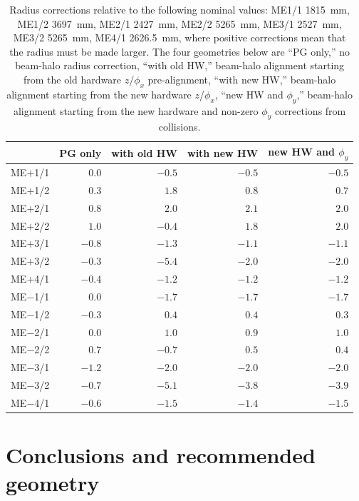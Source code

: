 \documentclass[12pt]{article}
\begin{document}
\begin{table}
\caption{Radius corrections relative to the following nominal values:
  ME1/1 1815~mm, ME1/2 3697~mm, ME2/1 2427~mm, ME2/2 5265~mm, ME3/1
  2527~mm, ME3/2 5265~mm, ME4/1 2626.5~mm, where positive corrections
  mean that the radius must be made larger.  The four geometries below
  are ``PG only,'' no beam-halo radius correction, ``with old HW,''
  beam-halo alignment starting from the old hardware $z$/$\phi_x$
  pre-alignment, ``with new HW,'' beam-halo alignment starting from
  the new hardware $z$/$\phi_x$, ``new HW and $\phi_y$,'' beam-halo
  alignment starting from the new hardware and non-zero $\phi_y$
  corrections from collisions. \label{tab:radiuscorrections}}
\begin{center}
\begin{tabular}{c r r r r}
& PG only & with old HW & with new HW & new HW and $\phi_y$ \\\hline
ME$+$1/1 &  $0.0$ & $-0.5$ & $-0.5$ & $-0.5$ \\
ME$+$1/2 &  $0.3$ &  $1.8$ &  $0.8$ &  $0.7$ \\
ME$+$2/1 &  $0.8$ &  $2.0$ &  $2.1$ &  $2.0$ \\
ME$+$2/2 &  $1.0$ & $-0.4$ &  $1.8$ &  $2.0$ \\
ME$+$3/1 & $-0.8$ & $-1.3$ & $-1.1$ & $-1.1$ \\
ME$+$3/2 & $-0.3$ & $-5.4$ & $-2.0$ & $-2.0$ \\
ME$+$4/1 & $-0.4$ & $-1.2$ & $-1.2$ & $-1.2$ \\\hline
ME$-$1/1 &  $0.0$ & $-1.7$ & $-1.7$ & $-1.7$ \\
ME$-$1/2 & $-0.3$ &  $0.4$ &  $0.4$ &  $0.3$ \\
ME$-$2/1 &  $0.0$ &  $1.0$ &  $0.9$ &  $1.0$ \\
ME$-$2/2 &  $0.7$ & $-0.7$ &  $0.5$ &  $0.4$ \\
ME$-$3/1 & $-1.2$ & $-2.0$ & $-2.0$ & $-2.0$ \\
ME$-$3/2 & $-0.7$ & $-5.1$ & $-3.8$ & $-3.9$ \\
ME$-$4/1 & $-0.6$ & $-1.5$ & $-1.4$ & $-1.5$ \\
\end{tabular}
\end{center}
\end{table}

\section{Conclusions and recommended geometry}
\end{document}
